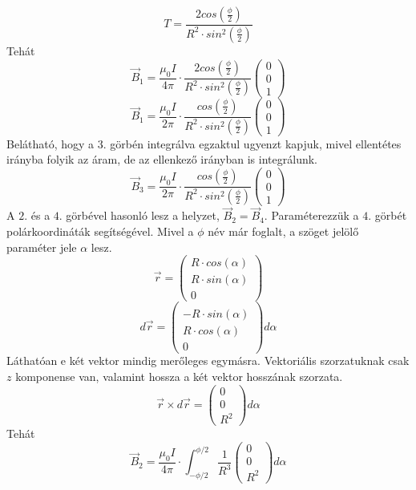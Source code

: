 \documentclass[11pt,a4paper,openany,leqno]{article}
\begin{document}
$$ T = \frac{2 cos(\frac{\phi}{2})}{R^2 \cdot sin^2(\frac{\phi}{2})} $$
\indent Tehát
$$ \vec{B}_1 = \frac{\mu_0 I}{4\pi} \cdot \frac{2 cos(\frac{\phi}{2})}{R^2 \cdot sin^2(\frac{\phi}{2})} \begin{pmatrix} 0 \\ 0 \\ 1 \end{pmatrix}$$
$$ \vec{B}_1 = \frac{\mu_0 I}{2\pi} \cdot \frac{cos(\frac{\phi}{2})}{R^2 \cdot sin^2(\frac{\phi}{2})} \begin{pmatrix} 0 \\ 0 \\ 1 \end{pmatrix}$$
\indent
Belátható, hogy a $3.$ görbén integrálva egzaktul ugyenzt kapjuk, mivel ellentétes irányba folyik az áram, de az ellenkező irányban is integrálunk.\\
$$ \vec{B}_3 = \frac{\mu_0 I}{2\pi} \cdot \frac{cos(\frac{\phi}{2})}{R^2 \cdot sin^2(\frac{\phi}{2})} \begin{pmatrix} 0 \\ 0 \\ 1 \end{pmatrix}$$
\indent
A $2.$ és a $4.$ görbével hasonló lesz a helyzet, $\vec{B}_2 = \vec{B}_4$. Paraméterezzük a $4.$ görbét polárkoordináták segítségével. Mivel a $\phi$ név már foglalt, a szöget jelölő paraméter jele $\alpha$ lesz.
$$ \vec{r} = \begin{pmatrix} R\cdot cos(\alpha)  \\ R\cdot sin(\alpha) \\ 0 \end{pmatrix} $$
$$ d\vec{r} = \begin{pmatrix}  \\ -R\cdot sin(\alpha) \\ R\cdot cos(\alpha) \\ 0 \end{pmatrix} d\alpha $$
\indent
Láthatóan e két vektor mindig merőleges egymásra. Vektoriális szorzatuknak csak $z$ komponense van, valamint hossza a két vektor hosszának szorzata.
$$ \vec{r} \times d\vec{r} = \begin{pmatrix} 0 \\ 0 \\ R^2 \end{pmatrix} d\alpha $$
\indent Tehát
$$ \vec{B}_2 = \frac{\mu_0 I}{4\pi} \cdot \int_{-\phi/2}^{\phi/2} \frac{1}{R^3}\begin{pmatrix} 0 \\ 0 \\ R^2 \end{pmatrix} d\alpha $$
\end{document}
